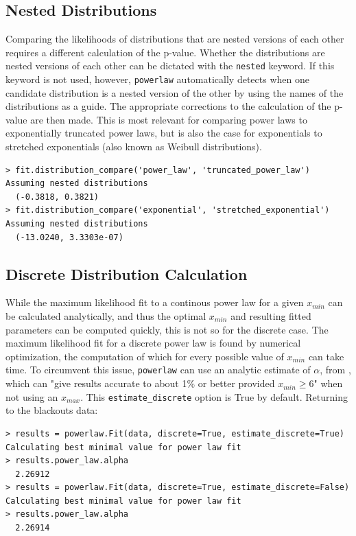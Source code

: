\documentclass[10pt]{article}
\begin{document}
\subsection*{Nested Distributions}
Comparing the likelihoods of distributions that are nested versions of each other requires a different calculation of the p-value. Whether the distributions are nested versions of each other can be dictated with the \verb$nested$ keyword. If this keyword is not used, however, \verb$powerlaw$ automatically detects when one candidate distribution is a nested version of the other by using the names of the distributions as a guide. The appropriate corrections to the calculation of the p-value are then made. This is most relevant for comparing power laws to exponentially truncated power laws, but is also the case for exponentials to stretched exponentials (also known as Weibull distributions). 

\begin{verbatim}
> fit.distribution_compare('power_law', 'truncated_power_law')
Assuming nested distributions
  (-0.3818, 0.3821)
> fit.distribution_compare('exponential', 'stretched_exponential')
Assuming nested distributions
  (-13.0240, 3.3303e-07)
\end{verbatim}

\subsection*{Discrete Distribution Calculation}
While the maximum likelihood fit to a continous power law for a given $x_{min}$ can be calculated analytically, and thus the optimal $x_{min}$ and resulting fitted parameters can be computed quickly, this is not so for the discrete case. The maximum likelihood fit for a discrete power law is found by numerical optimization, the computation of which for every possible value of $x_{min}$ can take time. To circumvent this issue, \verb$powerlaw$ can use an analytic estimate of $\alpha$, from \cite{Clauset2009}, which can "give results accurate to about 1\% or better provided $x_{min} \ge 6$" when not using an $x_{max}$.  This \verb"estimate_discrete" option is True by default. Returning to the blackouts data:

\begin{verbatim}
> results = powerlaw.Fit(data, discrete=True, estimate_discrete=True)
Calculating best minimal value for power law fit
> results.power_law.alpha
  2.26912
> results = powerlaw.Fit(data, discrete=True, estimate_discrete=False)
Calculating best minimal value for power law fit
> results.power_law.alpha
  2.26914
\end{verbatim}
\end{document}
